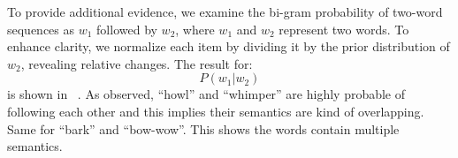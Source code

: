 
To provide additional evidence, we examine the bi-gram probability of two-word sequences as $w_1$ followed by $w_2$, where $w_1$ and $w_2$ represent two words. To enhance clarity, we normalize each item by dividing it by the prior distribution of $w_2$, revealing relative changes. The result for: 
\begin{equation}
{P (w_1|w_2)}
\end{equation}
is shown in ~. As observed, ``howl'' and ``whimper'' are highly probable of following each other and this implies their semantics are kind of overlapping. Same for ``bark'' and ``bow-wow''. This shows the words contain multiple semantics.
